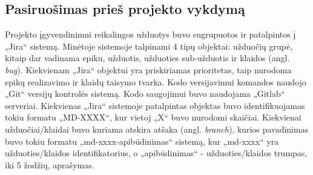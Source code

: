 \documentclass{VUMIFPSbakalaurinis}
\begin{document}
\subsection{Pasiruošimas prieš projekto vykdymą}

Projekto įgyvendinimui reikalingos užduotys buvo sugrupuotos ir patalpintos į „Jira“ sistemą. Minėtoje sistemoje talpinami 4 tipų objektai: užduočių grupė, kitaip dar vadinama epiku, užduotis, užduoties sub-užduotis ir klaidos (angl. \textit{bug}). Kiekvienam „Jira“ objektui yra priskiriamas prioritetas, taip nurodoma epikų realizavimo ir klaidų taisymo tvarka. Kodo versijavimui komandos naudojo „Git“ versijų kontrolės sistemą. Kodo saugojimui buvo naudojama „Gitlab“ serveriai. Kiekvienas „Jira“ sistemoje patalpintas objektas buvo identifikuojamas tokiu formatu „MD-XXXX“, kur vietoj „X“ buvo nurodomi skaičiai. Kiekvienai užduočiai/klaidai buvo kuriama atskira atšaka (angl. \textit{branch}), kurios pavadinimas buvo tokiu formatu „md-xxxx-apibūdinimas“ sistemą, kur „md-xxxx“ yra užduoties/klaidos identifikatorius, o „apibūdinimas“ - užduoties/klaidos trumpas, iki 5 žodžių, aprašymas.
\end{document}
